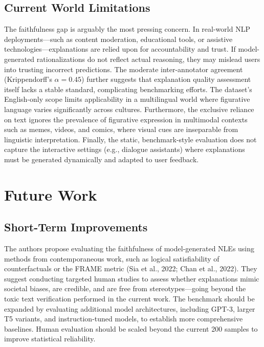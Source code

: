 \documentclass[12pt]{article}
\begin{document}
\subsection{Current World Limitations}

The faithfulness gap is arguably the most pressing concern. In real-world NLP deployments---such as content moderation, educational tools, or assistive technologies---explanations are relied upon for accountability and trust. If model-generated rationalizations do not reflect actual reasoning, they may mislead users into trusting incorrect predictions. The moderate inter-annotator agreement (Krippendorff's $\alpha = 0.45$) further suggests that explanation quality assessment itself lacks a stable standard, complicating benchmarking efforts. The dataset's English-only scope limits applicability in a multilingual world where figurative language varies significantly across cultures. Furthermore, the exclusive reliance on text ignores the prevalence of figurative expression in multimodal contexts such as memes, videos, and comics, where visual cues are inseparable from linguistic interpretation. Finally, the static, benchmark-style evaluation does not capture the interactive settings (e.g., dialogue assistants) where explanations must be generated dynamically and adapted to user feedback.

\section{Future Work}

\subsection{Short-Term Improvements}

The authors propose evaluating the faithfulness of model-generated NLEs using methods from contemporaneous work, such as logical satisfiability of counterfactuals or the FRAME metric (Sia et al., 2022; Chan et al., 2022). They suggest conducting targeted human studies to assess whether explanations mimic societal biases, are credible, and are free from stereotypes---going beyond the toxic text verification performed in the current work. The benchmark should be expanded by evaluating additional model architectures, including GPT-3, larger T5 variants, and instruction-tuned models, to establish more comprehensive baselines. Human evaluation should be scaled beyond the current 200 samples to improve statistical reliability.
\end{document}
